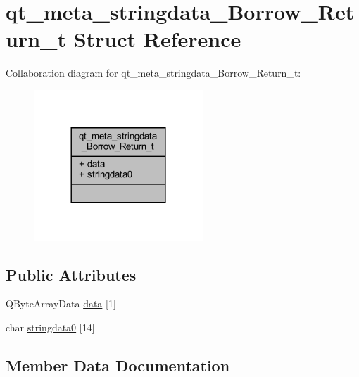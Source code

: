 \hypertarget{structqt__meta__stringdata___borrow___return__t}{}\section{qt\+\_\+meta\+\_\+stringdata\+\_\+\+Borrow\+\_\+\+Return\+\_\+t Struct Reference}
\label{structqt__meta__stringdata___borrow___return__t}


Collaboration diagram for qt\+\_\+meta\+\_\+stringdata\+\_\+\+Borrow\+\_\+\+Return\+\_\+t\+:
\nopagebreak
\begin{figure}[H]
\begin{center}
\leavevmode
\includegraphics[width=180pt]{structqt__meta__stringdata___borrow___return__t__coll__graph}
\end{center}
\end{figure}
\subsection*{Public Attributes}
\begin{DoxyCompactItemize}
\item 
Q\+Byte\+Array\+Data \mbox{\hyperlink{structqt__meta__stringdata___borrow___return__t_a71c2422cae6fceb3e23fd2643e0af0ac}{data}} \mbox{[}1\mbox{]}
\item 
char \mbox{\hyperlink{structqt__meta__stringdata___borrow___return__t_af522534c107d37af9d99ec2fa61966a7}{stringdata0}} \mbox{[}14\mbox{]}
\end{DoxyCompactItemize}


\subsection{Member Data Documentation}
\mbox{\label{structqt__meta__stringdata___borrow___return__t_a71c2422cae6fceb3e23fd2643e0af0ac}} 
